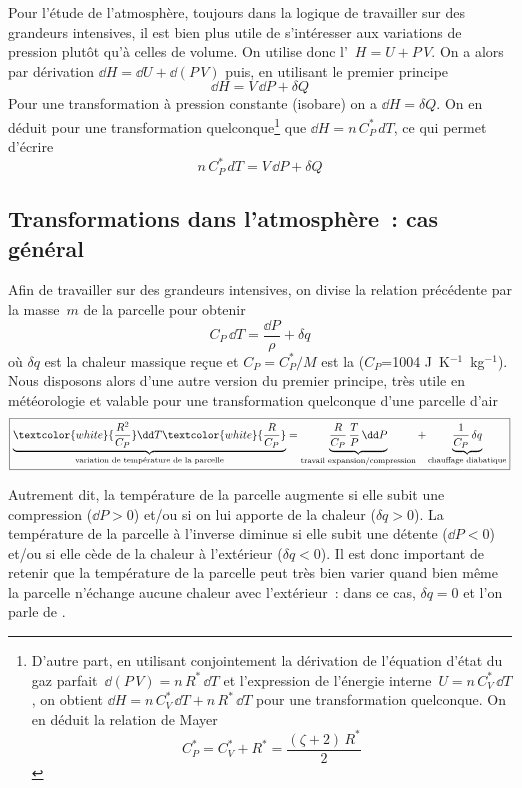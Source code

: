 \sk
Pour l'étude de l'atmosphère, toujours dans la logique de travailler sur des grandeurs intensives, il est  bien plus utile de s'intéresser aux variations de pression plutôt qu'à celles de volume. On utilise donc l'~$H = U + P \, V$. On a alors par dérivation $ \dd H = \dd U + \dd (P\,V) $ puis, en utilisant le premier principe
\[ \dd H = V \, \dd P + \delta Q \]
Pour une transformation à pression constante (isobare) on a $\dd H = \delta Q$. On en déduit pour une transformation quelconque\footnote{
D'autre part, en utilisant conjointement la dérivation de l'équation d'état du gaz parfait~$\dd (P\,V) = n \, R^* \, \dd T$ et l'expression de l'énergie interne~$U = n \, C_V^* \, \dd T$, on obtient $\dd H = n \, C_V^* \, \dd T + n \, R^* \, \dd T$ pour une transformation quelconque. On en déduit la relation de Mayer \[ C_P^* = C_V^* + R^* = \frac{(\zeta+2) \, R^*}{2}\]
} 
que $\dd H = n \, C_P^* \, dT$, ce qui permet d'écrire
\[ n \, C_P^* \, dT = V \, \dd P + \delta Q \]

\sk
\subsection{Transformations dans l'atmosphère~: cas général}

\sk
Afin de travailler sur des grandeurs intensives, on divise la relation précédente par la masse~$m$ de la parcelle pour obtenir
\[ C_P \, \dd T = \frac{\dd P}{\rho} + \delta q \]
où $\delta q$ est la chaleur massique reçue et $C_P = C_P^* / M$ est la  ($C_P$=1004 J~K$^{-1}$~kg$^{-1}$). Nous disposons alors d'une autre version du premier principe, très utile en météorologie et valable pour une transformation quelconque d'une parcelle d'air
\[ \boxed{ \underbrace{\textcolor{white}{\frac{R^2}{C_P}} \dd T \textcolor{white}{\frac{R}{C_P}}}_{\text{variation de température de la parcelle}} = \underbrace{\frac{R}{C_P} \, \frac{T}{P} \, \dd P}_{\text{travail expansion/compression}} + \underbrace{\frac{1}{C_P} \, \delta q}_{\text{chauffage diabatique}} } \]

\sk
Autrement dit, la température de la parcelle augmente si elle subit une compression ($\dd P > 0$) et/ou si on lui apporte de la chaleur ($\delta q > 0$). La température de la parcelle à l'inverse diminue si elle subit une détente ($\dd P < 0$) et/ou si elle cède de la chaleur à l'extérieur ($\delta q < 0$). Il est donc important de retenir que la température de la parcelle peut très bien varier quand bien même la parcelle n'échange aucune chaleur avec l'extérieur~: dans ce cas, $\delta q = 0$ et l'on parle de . 

